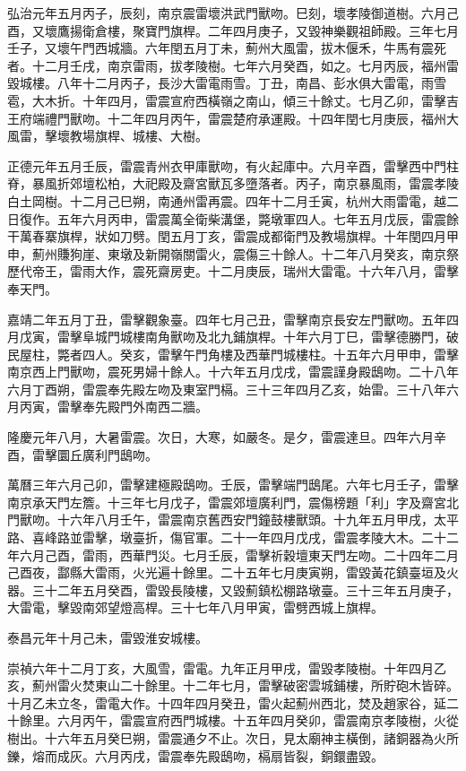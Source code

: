 \begin{pinyinscope}
弘治元年五月丙子，辰刻，南京震雷壞洪武門獸吻。巳刻，壞孝陵御道樹。六月己酉，又壞鷹揚衛倉樓，聚寶門旗桿。二年四月庚子，又毀神樂觀祖師殿。三年七月壬子，又壞午門西城牆。六年閏五月丁未，薊州大風雷，拔木偃禾，牛馬有震死者。十二月壬戌，南京雷雨，拔孝陵樹。七年六月癸酉，如之。七月丙辰，福州雷毀城樓。八年十二月丙子，長沙大雷電雨雪。丁丑，南昌、彭水俱大雷電，雨雪雹，大木折。十年四月，雷震宣府西橫嶺之南山，傾三十餘丈。七月乙卯，雷擊吉王府端禮門獸吻。十二年四月丙午，雷震楚府承運殿。十四年閏七月庚辰，福州大風雷，擊壞教場旗桿、城樓、大樹。

正德元年五月壬辰，雷震青州衣甲庫獸吻，有火起庫中。六月辛酉，雷擊西中門柱脊，暴風折郊壇松柏，大祀殿及齋宮獸瓦多墮落者。丙子，南京暴風雨，雷震孝陵白土岡樹。十二月己巳朔，南通州雷再震。四年十二月壬寅，杭州大雨雷電，越二日復作。五年六月丙申，雷震萬全衛柴溝堡，斃墩軍四人。七年五月戊辰，雷震餘干萬春寨旗桿，狀如刀劈。閏五月丁亥，雷震成都衛門及教場旗桿。十年閏四月甲申，薊州賺狗崖、東墩及新開嶺關雷火，震傷三十餘人。十二年八月癸亥，南京祭歷代帝王，雷雨大作，震死齋房吏。十二月庚辰，瑞州大雷電。十六年八月，雷擊奉天門。

嘉靖二年五月丁丑，雷擊觀象臺。四年七月己丑，雷擊南京長安左門獸吻。五年四月戊寅，雷擊阜城門城樓南角獸吻及北九鋪旗桿。十年六月丁巳，雷擊德勝門，破民屋柱，斃者四人。癸亥，雷擊午門角樓及西華門城樓柱。十五年六月甲申，雷擊南京西上門獸吻，震死男婦十餘人。十六年五月戊戌，雷震謹身殿鴟吻。二十八年六月丁酉朔，雷震奉先殿左吻及東室門槅。三十三年四月乙亥，始雷。三十八年六月丙寅，雷擊奉先殿門外南西二牆。

隆慶元年八月，大暑雷震。次日，大寒，如嚴冬。是夕，雷震達旦。四年六月辛酉，雷擊圜丘廣利門鴟吻。

萬曆三年六月己卯，雷擊建極殿鴟吻。壬辰，雷擊端門鴟尾。六年七月壬子，雷擊南京承天門左簷。十三年七月戊子，雷震郊壇廣利門，震傷榜題「利」字及齋宮北門獸吻。十六年八月壬午，雷震南京舊西安門鐘鼓樓獸頭。十九年五月甲戌，太平路、喜峰路並雷擊，墩臺折，傷官軍。二十一年四月戊戌，雷震孝陵大木。二十二年六月己酉，雷雨，西華門災。七月壬辰，雷擊祈穀壇東天門左吻。二十四年二月己酉夜，酃縣大雷雨，火光遍十餘里。二十五年七月庚寅朔，雷毀黃花鎮臺垣及火器。三十二年五月癸酉，雷毀長陵樓，又毀薊鎮松棚路墩臺。三十三年五月庚子，大雷電，擊毀南郊望燈高桿。三十七年八月甲寅，雷劈西城上旗桿。

泰昌元年十月己未，雷毀淮安城樓。

崇禎六年十二月丁亥，大風雪，雷電。九年正月甲戌，雷毀孝陵樹。十年四月乙亥，薊州雷火焚東山二十餘里。十二年七月，雷擊破密雲城鋪樓，所貯砲木皆碎。十月乙未立冬，雷電大作。十四年四月癸丑，雷火起薊州西北，焚及趙家谷，延二十餘里。六月丙午，雷震宣府西門城樓。十五年四月癸卯，雷震南京孝陵樹，火從樹出。十六年五月癸巳朔，雷震通夕不止。次日，見太廟神主橫倒，諸銅器為火所鑠，熔而成灰。六月丙戌，雷震奉先殿鴟吻，槅扇皆裂，銅鐶盡毀。


\end{pinyinscope}
